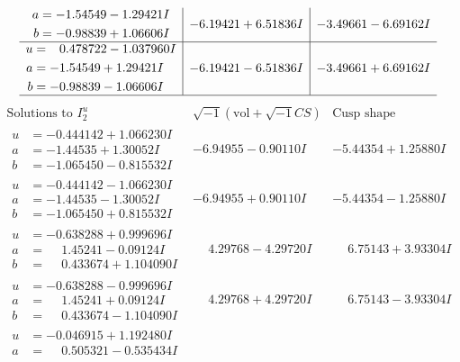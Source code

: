 \documentclass[1p]{elsarticle_modified}
\theoremstyle{definition}
\newcommand{\I}{\sqrt{-1}}
\begin{document}
$$\begin{array}{c|c|c}
\begin{aligned}
a &= -1.54549 - 1.29421 I \\
b &= -0.98839 + 1.06606 I\end{aligned}
 & -6.19421 + 6.51836 I & -3.49661 - 6.69162 I \\ \hline\begin{aligned}
u &= \phantom{-}0.478722 - 1.037960 I \\
a &= -1.54549 + 1.29421 I \\
b &= -0.98839 - 1.06606 I\end{aligned}
 & -6.19421 - 6.51836 I & -3.49661 + 6.69162 I\\
 \hline 
 \end{array}$$\newpage$$\begin{array}{c|c|c}  
\text{Solutions to }I^u_{2}& \I (\text{vol} + \sqrt{-1}CS) & \text{Cusp shape}\\
 \hline 
\begin{aligned}
u &= -0.444142 + 1.066230 I \\
a &= -1.44535 + 1.30052 I \\
b &= -1.065450 - 0.815532 I\end{aligned}
 & -6.94955 - 0.90110 I & -5.44354 + 1.25880 I \\ \hline\begin{aligned}
u &= -0.444142 - 1.066230 I \\
a &= -1.44535 - 1.30052 I \\
b &= -1.065450 + 0.815532 I\end{aligned}
 & -6.94955 + 0.90110 I & -5.44354 - 1.25880 I \\ \hline\begin{aligned}
u &= -0.638288 + 0.999696 I \\
a &= \phantom{-}1.45241 - 0.09124 I \\
b &= \phantom{-}0.433674 + 1.104090 I\end{aligned}
 & \phantom{-}4.29768 - 4.29720 I & \phantom{-}6.75143 + 3.93304 I \\ \hline\begin{aligned}
u &= -0.638288 - 0.999696 I \\
a &= \phantom{-}1.45241 + 0.09124 I \\
b &= \phantom{-}0.433674 - 1.104090 I\end{aligned}
 & \phantom{-}4.29768 + 4.29720 I & \phantom{-}6.75143 - 3.93304 I \\ \hline\begin{aligned}
u &= -0.046915 + 1.192480 I \\
a &= \phantom{-}0.505321 - 0.535434 I \\

\end{aligned}
\end{array}$$
\end{document}
